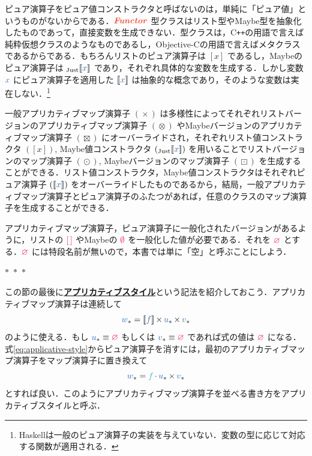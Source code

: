 \documentclass[a5paper,twoside,fleqn,draft]{jsbook}
\def\[{[\![}
\def\]{]\!]}
\def\constantColor{WildStrawberry}
\def\varColor{NavyBlue}
\def\funcColor{BlueGreen}
\def\typeColor{RedOrange}
\newcommand{\separator}{\begin{center}$*$~$*$~$*$\end{center}}
\newcommand{\programminglanguage}[1]{\textsf{#1}}
\newcommand{\cxx}{\programminglanguage{C}\texttt{++}}
\newcommand{\haskell}{\programminglanguage{Haskell}}
\newcommand{\objectivec}{\programminglanguage{Objective-C}}
\newcommand{\keyword}[1]{{\underline{\textbf{#1}}}}
\newcommand{\mEmptyList}{{\textcolor{\constantColor}{[\,]}}}
\newcommand{\mNothing}{\textcolor{\constantColor}{\emptyset}}
\newcommand{\mPureNothing}{\textcolor{\constantColor}{\varnothing}}
\newcommand{\mVar}[1]{\textcolor{\varColor}{#1}}
\newcommand{\mXVar}{\mVar{x}}
\newcommand{\mFunc}[1]{\textcolor{\funcColor}{#1}}
\newcommand{\mFFunc}{{\mFunc{f}}}
\DeclareMathOperator{\mAppMap}{\times}
\DeclareMathOperator{\mAppMapList}{\otimes}
\DeclareMathOperator{\mAppMapMaybe}{\boxtimes}
\DeclareMathOperator{\mMap}{\cdot}
\DeclareMathOperator{\mMapList}{\odot}
\DeclareMathOperator{\mMapMaybe}{\boxdot}
\newcommand{\mValueConstructor}[1]{\mathrm{#1}}
\newcommand{\mValueWith}[2]{{}_\mValueConstructor{#1}\[\mVar{#2}\]}
\newcommand{\mJustWith}[1]{\mValueWith{Just}{#1}}
\newcommand{\mPureWith}[1]{\[\mVar{#1}\]}
\newcommand{\mTypeClass}[1]{\textcolor{\typeColor}{\textbf{\textit{#1}}}}
\newcommand{\mFunctorTypeClass}{\mTypeClass{Functor}}
\newcommand{\mVarContainer}[1]{\mVar{#1}_*}
\begin{document}
ピュア演算子をピュア値コンストラクタと呼ばないのは，単純に「ピュア値」というものがないからである．$\mFunctorTypeClass$ 型クラスはリスト型やMaybe型を抽象化したものであって，直接変数を生成できない．型クラスは，\cxx の用語で言えば純粋仮想クラスのようなものであるし，\objectivec の用語で言えばメタクラスであるからである．もちろんリストのピュア演算子は $[x]$ であるし，Maybeのピュア演算子は $\mJustWith{x}$ であり，それぞれ具体的な変数を生成する．しかし変数 $\mXVar$ にピュア演算子を適用した
$\mPureWith{x}$ は抽象的な概念であり，そのような変数は実在しない．\footnote{\haskell は一般のピュア演算子の実装を与えていない．変数の型に応じて対応する関数が適用される．}

一般アプリカティブマップ演算子 $(\mAppMap)$ は多様性によってそれぞれリストバージョンのアプリカティブマップ演算子 $(\mAppMapList)$ やMaybeバージョンのアプリカティブマップ演算子 $(\mAppMapMaybe)$ にオーバーライドされ，それぞれリスト値コンストラクタ $([x])$, Maybe値コンストラクタ $(\mJustWith{x})$ を用いることでリストバージョンのマップ演算子 $(\mMapList)$, Maybeバージョンのマップ演算子 $(\mMapMaybe)$ を生成することができる．リスト値コンストラクタ，Maybe値コンストラクタはそれぞれピュア演算子 $(\mPureWith{x})$ をオーバーライドしたものであるから，結局，一般アプリカティブマップ演算子とピュア演算子のふたつがあれば，任意のクラスのマップ演算子を生成することができる．

アプリカティブマップ演算子，ピュア演算子に一般化されたバージョンがあるように，リストの $\mEmptyList$ やMaybeの $\mNothing$ を一般化した値が必要である．それを $\mPureNothing$ とする．$\mPureNothing$ には特段名前が無いので，本書では単に「空」と呼ぶことにしよう．

\separator

この節の最後に\keyword{アプリカティブスタイル}という記法を紹介しておこう．アプリカティブマップ演算子は連続して
\begin{equation}
  \label{eq:applicative-style}
  \mVarContainer{w}
  =\mPureWith{f}\mAppMap\mVarContainer{u}\mAppMap\mVarContainer{v}
\end{equation}
のように使える．もし $\mVarContainer{u}\equiv\mPureNothing$ もしくは $\mVarContainer{v}\equiv\mPureNothing$ であれば式の値は $\mPureNothing$ になる．式\eqref{eq:applicative-style}からピュア演算子を消すには，最初のアプリカティブマップ演算子をマップ演算子に置き換えて
\begin{equation}
  \mVarContainer{w}=\mFFunc\mMap\mVarContainer{u}\mAppMap\mVarContainer{v}
\end{equation}
とすれば良い．このようにアプリカティブマップ演算子を並べる書き方をアプリカティブスタイルと呼ぶ．
\end{document}
